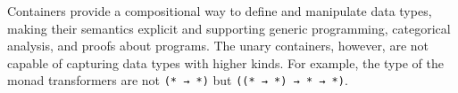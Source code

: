 \begin{code}%
\>[0]\AgdaSpace{}%
\AgdaSymbol{:}\AgdaSpace{}%
\AgdaSpace{}%
\AgdaSpace{}%
\AgdaSpace{}%
\AgdaSpace{}%
\<%
\\
\>[0]\AgdaSpace{}%
\AgdaSpace{}%
\AgdaSymbol{=}\AgdaSpace{}%
\<%
\\
\>[0]\AgdaSpace{}%
\AgdaSymbol{(}\AgdaSpace{}%
\AgdaSymbol{)}\AgdaSpace{}%
\AgdaSymbol{=}\AgdaSpace{}%
\<%
\\
\>[0]\AgdaSpace{}%
\AgdaSymbol{(}\AgdaSpace{}%
\AgdaSpace{}%
\AgdaSymbol{)}\AgdaSpace{}%
\AgdaSymbol{=}\AgdaSpace{}%
\AgdaSpace{}%
\<%
\\
\>[0]\AgdaSpace{}%
\AgdaSymbol{(}\AgdaSpace{}%
\AgdaSpace{}%
\AgdaSpace{}%
\AgdaSymbol{)}\AgdaSpace{}%
\AgdaSymbol{=}\AgdaSpace{}%
\AgdaSpace{}%
\AgdaSpace{}%
\<%
\\
\>[0]\<%
\end{code}

Containers provide a compositional way to define and manipulate data types, making their semantics explicit and supporting generic programming, categorical analysis, and proofs about programs. The unary containers, however, are not capable of capturing data types with higher kinds. For example, the type of the monad transformers\cite{liang1995monad} are not \texttt{(* → *)} but \texttt{((* → *) → * → *)}.

\begin{code}%
\>[0]\AgdaSpace{}%
\AgdaSymbol{:}\AgdaSpace{}%
\AgdaSymbol{(}\AgdaSpace{}%
\AgdaSpace{}%
\AgdaSymbol{)}\AgdaSpace{}%
\AgdaSpace{}%
\AgdaSpace{}%
\AgdaSpace{}%
\<%
\\
\>[0]\AgdaSpace{}%
\AgdaSpace{}%
\AgdaSpace{}%
\AgdaSymbol{=}\AgdaSpace{}%
\AgdaSpace{}%
\AgdaSymbol{(}\AgdaSpace{}%
\AgdaSpace{}%
\AgdaSymbol{)}\<%
\end{code}

